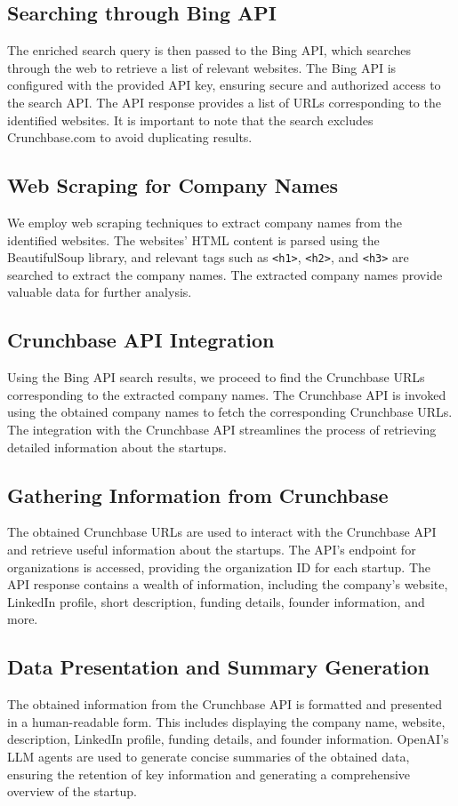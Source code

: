 \documentclass[a4paper,11pt]{article}
\begin{document}
\subsection{Searching through Bing API}
The enriched search query is then passed to the Bing API, which searches through the web to retrieve a list of relevant websites. The Bing API is configured with the provided API key, ensuring secure and authorized access to the search API. The API response provides a list of URLs corresponding to the identified websites. It is important to note that the search excludes Crunchbase.com to avoid duplicating results.

\subsection{Web Scraping for Company Names}
We employ web scraping techniques to extract company names from the identified websites. The websites' HTML content is parsed using the BeautifulSoup library, and relevant tags such as \texttt{<h1>}, \texttt{<h2>}, and \texttt{<h3>} are searched to extract the company names. The extracted company names provide valuable data for further analysis.

\subsection{Crunchbase API Integration}
Using the Bing API search results, we proceed to find the Crunchbase URLs corresponding to the extracted company names. The Crunchbase API is invoked using the obtained company names to fetch the corresponding Crunchbase URLs. The integration with the Crunchbase API streamlines the process of retrieving detailed information about the startups.

\subsection{Gathering Information from Crunchbase}
The obtained Crunchbase URLs are used to interact with the Crunchbase API and retrieve useful information about the startups. The API's endpoint for organizations is accessed, providing the organization ID for each startup. The API response contains a wealth of information, including the company's website, LinkedIn profile, short description, funding details, founder information, and more.

\subsection{Data Presentation and Summary Generation}
The obtained information from the Crunchbase API is formatted and presented in a human-readable form. This includes displaying the company name, website, description, LinkedIn profile, funding details, and founder information. OpenAI's LLM agents are used to generate concise summaries of the obtained data, ensuring the retention of key information and generating a comprehensive overview of the startup.
\end{document}
